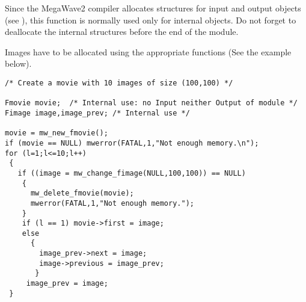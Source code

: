 Since the MegaWave2 compiler allocates structures for input and output 
objects (see \volI), this function is normally used only for internal objects.
Do not forget to deallocate the internal structures before the end
of the module.

Images have to be allocated using the appropriate functions (See the example
below).

\Next
\Example
\begin{verbatim}
/* Create a movie with 10 images of size (100,100) */

Fmovie movie;  /* Internal use: no Input neither Output of module */
Fimage image,image_prev; /* Internal use */

movie = mw_new_fmovie();
if (movie == NULL) mwerror(FATAL,1,"Not enough memory.\n");
for (l=1;l<=10;l++)
 {
   if ((image = mw_change_fimage(NULL,100,100)) == NULL)
    {
      mw_delete_fmovie(movie);
      mwerror(FATAL,1,"Not enough memory.");
    }
    if (l == 1) movie->first = image;
    else
      {
        image_prev->next = image;
        image->previous = image_prev;
       }
     image_prev = image;
 }
\end{verbatim}
\newpage %

